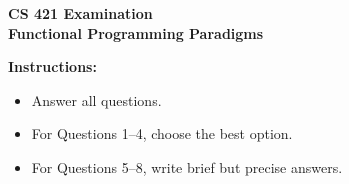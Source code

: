 \documentclass[11pt]{article}
\begin{document}
\begin{center}
  {\Large \textbf{CS 421 Examination}}\\[0.25em]
  {\large \textbf{Functional Programming Paradigms}}\\[0.5em]
\end{center}

\noindent\textbf{Instructions:}
\begin{itemize}
  \item Answer all questions.
  \item For Questions 1--4, choose the best option.
  \item For Questions 5--8, write brief but precise answers.
\end{itemize}

\vspace{0.5em}
\end{document}
